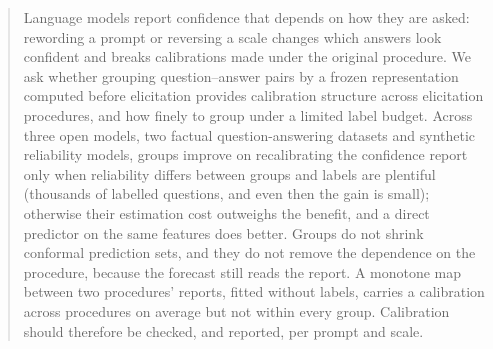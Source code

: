 \documentclass[11pt]{article}
\theoremstyle{definition}
\theoremstyle{remark}
\newcommand{\1}{\mathbf{1}}
\begin{document}
\begin{abstract}
Language models report confidence that depends on how they are asked: rewording a prompt or reversing
a scale changes which answers look confident and breaks calibrations made under the original
procedure. We ask whether grouping question--answer pairs by a frozen representation computed before
elicitation provides calibration structure across elicitation procedures, and how finely to group under
a limited label budget. Across three open models, two factual question-answering datasets and synthetic
reliability models, groups improve on recalibrating the confidence report only when reliability differs
between groups and labels are plentiful (thousands of labelled questions, and even then the gain is
small); otherwise their estimation cost outweighs the benefit, and a direct predictor on the same
features does better. Groups do not shrink conformal prediction sets, and they do not remove the
dependence on the procedure, because the forecast still reads the report. A monotone map between two
procedures' reports, fitted without labels, carries a calibration across procedures on average but not
within every group. Calibration should therefore be checked, and reported, per prompt and scale. 
\end{abstract}
\end{document}
